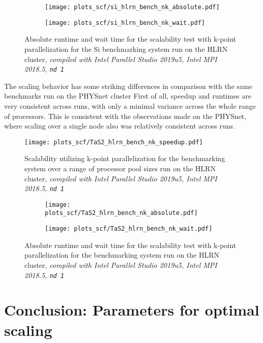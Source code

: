 \documentclass[main.tex]{subfiles}
\begin{document}
\begin{figure}[ht!]
\begin{subfigure}[b]{0.49\textwidth}
    \centering
    \texttt{[image: plots\_scf/si\_hlrn\_bench\_nk\_absolute.pdf]}
\end{subfigure}
\begin{subfigure}[b]{0.49\textwidth}
    \centering
    \texttt{[image: plots\_scf/si\_hlrn\_bench\_nk\_wait.pdf]}
\end{subfigure}
\caption{Absolute runtime and wait time for the scalability test with k-point parallelization for the Si benchmarking system run on the HLRN cluster, \emph{\QE compiled with Intel Parallel Studio 2019u5, Intel MPI 2018.5, \texttt{nd 1}}}
\label{fig:scaling_scf_hlrn_nk_si_absolute_wait}
\end{figure}
The scaling behavior has some striking differences in comparison with the same benchmarks run on the PHYSnet cluster
First of all, speedup and runtimes are very consistent across runs, with only a minimal variance across the whole range of processors.
This is consistent with the observations made on the PHYSnet, where scaling over a single node also was relatively consistent across runs.


\begin{figure}[ht!]
\centering
\texttt{[image: plots\_scf/TaS2\_hlrn\_bench\_nk\_speedup.pdf]}
\caption{Scalability utilizing k-point parallelization for the \TaS benchmarking system over a range of processor pool sizes run on the HLRN cluster, \emph{\QE compiled with Intel Parallel Studio 2019u5, Intel MPI 2018.5, \texttt{nd 1}}}
\label{fig:scaling_scf_hlrn_nk_TaS2_speedup}
\end{figure}

\begin{figure}[ht!]
\begin{subfigure}[b]{0.49\textwidth}
    \centering
    \texttt{[image: plots\_scf/TaS2\_hlrn\_bench\_nk\_absolute.pdf]}
\end{subfigure}
\begin{subfigure}[b]{0.49\textwidth}
    \centering
    \texttt{[image: plots\_scf/TaS2\_hlrn\_bench\_nk\_wait.pdf]}
\end{subfigure}
\caption{Absolute runtime and wait time for the scalability test with k-point parallelization for the \TaS benchmarking system run on the HLRN cluster, \emph{\QE compiled with Intel Parallel Studio 2019u5, Intel MPI 2018.5, \texttt{nd 1}}}
\label{fig:scaling_scf_hlrn_nk_TaS2_absolute_wait}
\end{figure}

\section{Conclusion: Parameters for optimal scaling}
\end{document}

